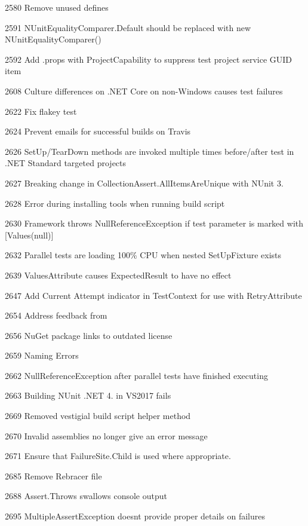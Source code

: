 \begin{DoxyItemize}
\item 2580 Remove unused defines
\item 2591 N\+Unit\+Equality\+Comparer.\+Default should be replaced with new N\+Unit\+Equality\+Comparer()
\item 2592 Add .props with Project\+Capability to suppress test project service G\+U\+ID item
\item 2608 Culture differences on .N\+ET Core on non-\/\+Windows causes test failures
\item 2622 Fix flakey test
\item 2624 Prevent emails for successful builds on Travis
\item 2626 Set\+Up/\+Tear\+Down methods are invoked multiple times before/after test in .N\+ET Standard targeted projects
\item 2627 Breaking change in Collection\+Assert.\+All\+Items\+Are\+Unique with N\+Unit 3.
\item 2628 Error during installing tools when running build script
\item 2630 Framework throws Null\+Reference\+Exception if test parameter is marked with [Values(null)]
\item 2632 Parallel tests are loading 100\% C\+PU when nested Set\+Up\+Fixture exists
\item 2639 Values\+Attribute causes Expected\+Result to have no effect
\item 2647 Add Current Attempt indicator in Test\+Context for use with Retry\+Attribute
\item 2654 Address feedback from 
\item 2656 Nu\+Get package links to outdated license
\item 2659 Naming Errors
\item 2662 Null\+Reference\+Exception after parallel tests have finished executing
\item 2663 Building N\+Unit .N\+ET 4. in V\+S2017 fails
\item 2669 Removed vestigial build script helper method
\item 2670 Invalid assemblies no longer give an error message
\item 2671 Ensure that Failure\+Site.\+Child is used where appropriate.
\item 2685 Remove Rebracer file
\item 2688 Assert.\+Throws swallows console output
\item 2695 Multiple\+Assert\+Exception doesn\textquotesingle{}t provide proper details on failures

\end{DoxyItemize}
